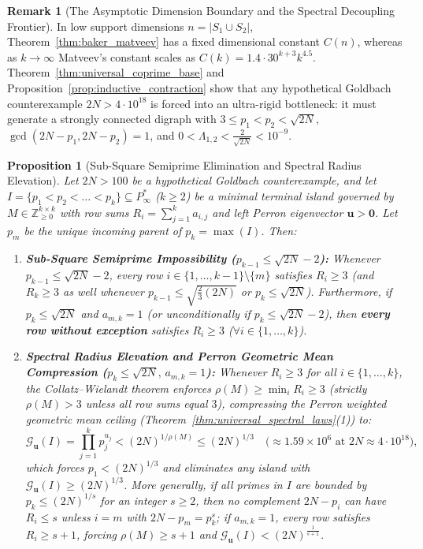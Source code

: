 \documentclass[11pt,a4paper]{article}
\newtheorem{proposition}[theorem]{Proposition}
\theoremstyle{definition}
\newtheorem{remark}[theorem]{Remark}
\begin{document}
\begin{remark}[The Asymptotic Dimension Boundary and the Spectral Decoupling Frontier]
\label{rem:asymptotic_boundary}
In low support dimensions $n = |S_1 \cup S_2|$, Theorem~\ref{thm:baker_matveev} has a fixed dimensional constant $C(n)$, whereas as $k \to \infty$ Matveev's constant scales as $C(k) = 1.4 \cdot 30^{k+3} k^{4.5}$. Theorem~\ref{thm:universal_coprime_base} and Proposition~\ref{prop:inductive_contraction} show that any hypothetical Goldbach counterexample $2N > 4 \cdot 10^{18}$ is forced into an ultra-rigid bottleneck: it must generate a strongly connected digraph with $3 \le p_1 < p_2 < \sqrt{2N}$, $\gcd(2N - p_1, 2N - p_2) = 1$, and $0 < \Lambda_{1,2} < \frac{2}{\sqrt{2N}} < 10^{-9}$.
\end{remark}

\begin{proposition}[Sub-Square Semiprime Elimination and Spectral Radius Elevation]
\label{prop:semiprime_elimination}
Let $2N > 100$ be a hypothetical Goldbach counterexample, and let $I = \{p_1 < p_2 < \dots < p_k\} \subseteq P^*_\infty$ ($k \ge 2$) be a minimal terminal island governed by $M \in \mathbb{Z}_{\ge 0}^{k \times k}$ with row sums $R_i = \sum_{j=1}^k a_{i,j}$ and left Perron eigenvector $\mathbf{u} > \mathbf{0}$. Let $p_m$ be the unique incoming parent of $p_k = \max(I)$. Then:
\begin{enumerate}
    \item \textbf{Sub-Square Semiprime Impossibility ($p_{k-1} \le \sqrt{2N} - 2$):} Whenever $p_{k-1} \le \sqrt{2N} - 2$, every row $i \in \{1, \dots, k-1\} \setminus \{m\}$ satisfies $R_i \ge 3$ (and $R_k \ge 3$ as well whenever $p_{k-1} \le \sqrt{\frac{2}{3}(2N)}$ or $p_k \le \sqrt{2N}$). Furthermore, if $p_k \le \sqrt{2N}$ and $a_{m,k} = 1$ (or unconditionally if $p_k \le \sqrt{2N} - 2$), then \textbf{every row without exception} satisfies $R_i \ge 3$ ($\forall i \in \{1, \dots, k\}$).
    \item \textbf{Spectral Radius Elevation and Perron Geometric Mean Compression ($p_k \le \sqrt{2N}, \, a_{m,k} = 1$):} Whenever $R_i \ge 3$ for all $i \in \{1, \dots, k\}$, the Collatz--Wielandt theorem enforces $\rho(M) \ge \min_i R_i \ge 3$ (strictly $\rho(M) > 3$ unless all row sums equal $3$), compressing the Perron weighted geometric mean ceiling (Theorem~\ref{thm:universal_spectral_laws}(1)) to:
    \begin{equation}
    \label{eq:geom_mean_third_root}
    \mathcal{G}_{\mathbf{u}}(I) = \prod_{j=1}^k p_j^{u_j} < (2N)^{1/\rho(M)} \le (2N)^{1/3} \quad \bigl(\approx 1.59 \times 10^6 \text{ at } 2N \approx 4 \cdot 10^{18}\bigr),
    \end{equation}
    which forces $p_1 < (2N)^{1/3}$ and eliminates any island with $\mathcal{G}_{\mathbf{u}}(I) \ge (2N)^{1/3}$. More generally, if all primes in $I$ are bounded by $p_k \le (2N)^{1/s}$ for an integer $s \ge 2$, then no complement $2N - p_i$ can have $R_i \le s$ unless $i = m$ with $2N - p_m = p_k^s$; if $a_{m,k} = 1$, every row satisfies $R_i \ge s + 1$, forcing $\rho(M) \ge s + 1$ and $\mathcal{G}_{\mathbf{u}}(I) < (2N)^{\frac{1}{s+1}}$.
\end{enumerate}
\end{proposition}
\end{document}
